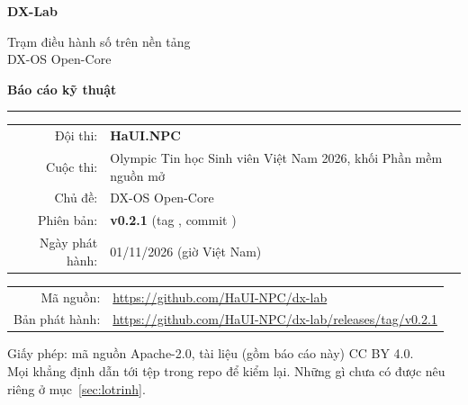 \documentclass[11pt,a4paper]{article}
\newcommand{\code}{\protect\codeX}
\begin{document}
\begin{titlepage}
\centering
\vspace*{1.5cm}
{\sffamily\color{dxblue}\fontsize{34}{40}\selectfont\bfseries DX-Lab\par}
\vspace{0.4cm}
{\sffamily\Large Trạm điều hành số trên nền tảng\\DX-OS Open-Core\par}
\vspace{0.8cm}
{\sffamily\Huge\bfseries Báo cáo kỹ thuật\par}
\vspace{1.2cm}
\rule{0.6\textwidth}{0.6pt}\par\vspace{0.8cm}
{\large
\begin{tabular}{rl}
Đội thi: & \textbf{HaUI.NPC}\\
Cuộc thi: & Olympic Tin học Sinh viên Việt Nam 2026, khối Phần mềm nguồn mở\\
Chủ đề: & DX-OS Open-Core\\
Phiên bản: & \textbf{v0.2.1} (tag \code{v0.2.1}, commit \code{3b06a1e})\\
Ngày phát hành: & 01/11/2026 (giờ Việt Nam)\\
\end{tabular}}\par
\vspace{1.2cm}
\begin{tabular}{rl}
Mã nguồn: & \url{https://github.com/HaUI-NPC/dx-lab}\\
Bản phát hành: & \url{https://github.com/HaUI-NPC/dx-lab/releases/tag/v0.2.1}\\
\end{tabular}\par
\vfill
\begin{minipage}{0.85\textwidth}\small\centering
Giấy phép: mã nguồn Apache-2.0, tài liệu (gồm báo cáo này) CC BY 4.0.\\
Mọi khẳng định dẫn tới tệp trong repo để kiểm lại. Những gì chưa có được nêu riêng ở mục~\ref{sec:lotrinh}.
\end{minipage}
\end{titlepage}

\end{document}
